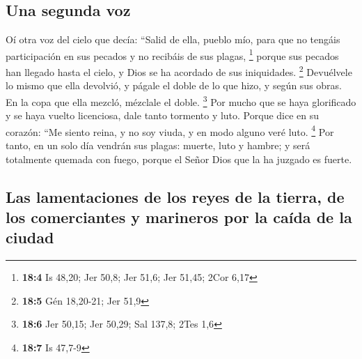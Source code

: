 \begin{paracol}{2}
\hypertarget{una-segunda-voz}{%
\subsection{Una segunda voz}\label{una-segunda-voz}}

 Oí otra voz del cielo que decía: ``Salid de ella, pueblo
mío, para que no tengáis participación en sus pecados y no recibáis de
sus plagas, \footnote{\textbf{18:4} Is 48,20; Jer 50,8; Jer 51,6; Jer
  51,45; 2Cor 6,17}  porque sus pecados han llegado hasta
el cielo, y Dios se ha acordado de sus iniquidades. \footnote{\textbf{18:5}
  Gén 18,20-21; Jer 51,9}  Devuélvele lo mismo que ella
devolvió, y págale el doble de lo que hizo, y según sus obras. En la
copa que ella mezcló, mézclale el doble. \footnote{\textbf{18:6} Jer
  50,15; Jer 50,29; Sal 137,8; 2Tes 1,6}  Por mucho que se
haya glorificado y se haya vuelto licenciosa, dale tanto tormento y
luto. Porque dice en su corazón: ``Me siento reina, y no soy viuda, y en
modo alguno veré luto. \footnote{\textbf{18:7} Is 47,7-9} 
Por tanto, en un solo día vendrán sus plagas: muerte, luto y hambre; y
será totalmente quemada con fuego, porque el Señor Dios que la ha
juzgado es fuerte.

\hypertarget{las-lamentaciones-de-los-reyes-de-la-tierra-de-los-comerciantes-y-marineros-por-la-cauxedda-de-la-ciudad}{%
\subsection{Las lamentaciones de los reyes de la tierra, de los
comerciantes y marineros por la caída de la
ciudad}\label{las-lamentaciones-de-los-reyes-de-la-tierra-de-los-comerciantes-y-marineros-por-la-cauxedda-de-la-ciudad}}


\end{paracol}
